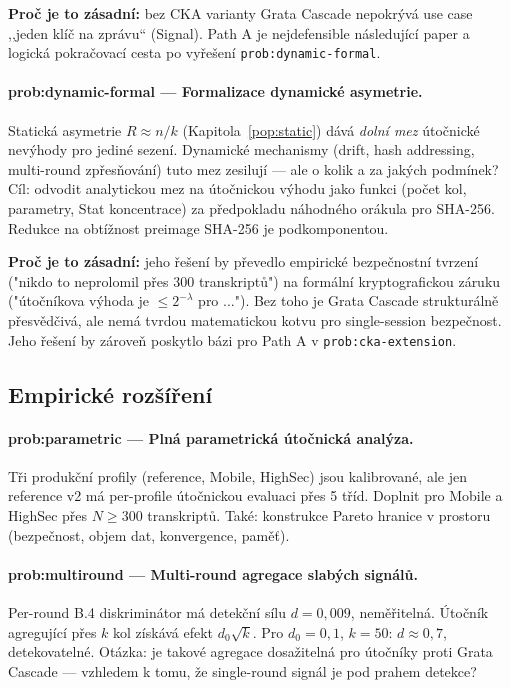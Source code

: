 \documentclass[11pt,a4paper]{article}
\begin{document}
\textbf{Proč je to zásadní:} bez CKA varianty Grata Cascade nepokrývá use case ,,jeden klíč na zprávu`` (Signal). Path A je nejdefensible následující paper a logická pokračovací cesta po vyřešení \texttt{prob:dynamic-formal}.

\paragraph{prob:dynamic-formal --- Formalizace dynamické asymetrie.} Statická asymetrie $R \approx n/k$ (Kapitola~\ref{pop:static}) dává \emph{dolní mez} útočnické nevýhody pro jediné sezení. Dynamické mechanismy (drift, hash addressing, multi-round zpřesňování) tuto mez zesilují --- ale o kolik a za jakých podmínek? Cíl: odvodit analytickou mez na útočnickou výhodu jako funkci (počet kol, parametry, Stat koncentrace) za předpokladu náhodného orákula pro SHA-256. Redukce na obtížnost preimage SHA-256 je podkomponentou.

\textbf{Proč je to zásadní:} jeho řešení by převedlo empirické bezpečnostní tvrzení ("nikdo to neprolomil přes 300 transkriptů") na formální kryptografickou záruku ("útočníkova výhoda je $\leq 2^{-\lambda}$ pro ..."). Bez toho je Grata Cascade strukturálně přesvědčivá, ale nemá tvrdou matematickou kotvu pro single-session bezpečnost. Jeho řešení by zároveň poskytlo bázi pro Path A v \texttt{prob:cka-extension}.

\subsection{Empirické rozšíření}

\paragraph{prob:parametric --- Plná parametrická útočnická analýza.} Tři produkční profily (reference, Mobile, HighSec) jsou kalibrované, ale jen reference v2 má per-profile útočnickou evaluaci přes 5 tříd. Doplnit pro Mobile a HighSec přes $N \geq 300$ transkriptů. Také: konstrukce Pareto hranice v prostoru (bezpečnost, objem dat, konvergence, paměť).

\paragraph{prob:multiround --- Multi-round agregace slabých signálů.} Per-round B.4 diskriminátor má detekční sílu $d = 0{,}009$, neměřitelná. Útočník agregující přes $k$ kol získává efekt $d_0 \sqrt{k}$. Pro $d_0 = 0{,}1$, $k = 50$: $d \approx 0{,}7$, detekovatelné. Otázka: je takové agregace dosažitelná pro útočníky proti Grata Cascade --- vzhledem k tomu, že single-round signál je pod prahem detekce?
\end{document}
